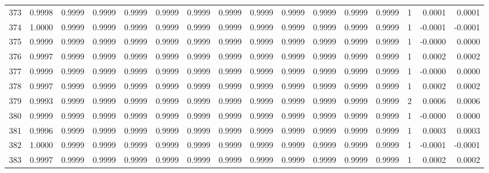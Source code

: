 \begin{tabular}{lrrrrrrrrrrrrrrr}
373 &      0.9998 &  0.9999 &  0.9999 &  0.9999 &  0.9999 &  0.9999 &  0.9999 &  0.9999 &  0.9999 &  0.9999 &   0.9999 &     0.9999 &      1 &                    0.0001 &                     0.0001 \\
374 &      1.0000 &  0.9999 &  0.9999 &  0.9999 &  0.9999 &  0.9999 &  0.9999 &  0.9999 &  0.9999 &  0.9999 &   0.9999 &     0.9999 &      1 &                   -0.0001 &                    -0.0001 \\
375 &      0.9999 &  0.9999 &  0.9999 &  0.9999 &  0.9999 &  0.9999 &  0.9999 &  0.9999 &  0.9999 &  0.9999 &   0.9999 &     0.9999 &      1 &                   -0.0000 &                     0.0000 \\
376 &      0.9997 &  0.9999 &  0.9999 &  0.9999 &  0.9999 &  0.9999 &  0.9999 &  0.9999 &  0.9999 &  0.9999 &   0.9999 &     0.9999 &      1 &                    0.0002 &                     0.0002 \\
377 &      0.9999 &  0.9999 &  0.9999 &  0.9999 &  0.9999 &  0.9999 &  0.9999 &  0.9999 &  0.9999 &  0.9999 &   0.9999 &     0.9999 &      1 &                   -0.0000 &                     0.0000 \\
378 &      0.9997 &  0.9999 &  0.9999 &  0.9999 &  0.9999 &  0.9999 &  0.9999 &  0.9999 &  0.9999 &  0.9999 &   0.9999 &     0.9999 &      1 &                    0.0002 &                     0.0002 \\
379 &      0.9993 &  0.9999 &  0.9999 &  0.9999 &  0.9999 &  0.9999 &  0.9999 &  0.9999 &  0.9999 &  0.9999 &   0.9999 &     0.9999 &      2 &                    0.0006 &                     0.0006 \\
380 &      0.9999 &  0.9999 &  0.9999 &  0.9999 &  0.9999 &  0.9999 &  0.9999 &  0.9999 &  0.9999 &  0.9999 &   0.9999 &     0.9999 &      1 &                   -0.0000 &                     0.0000 \\
381 &      0.9996 &  0.9999 &  0.9999 &  0.9999 &  0.9999 &  0.9999 &  0.9999 &  0.9999 &  0.9999 &  0.9999 &   0.9999 &     0.9999 &      1 &                    0.0003 &                     0.0003 \\
382 &      1.0000 &  0.9999 &  0.9999 &  0.9999 &  0.9999 &  0.9999 &  0.9999 &  0.9999 &  0.9999 &  0.9999 &   0.9999 &     0.9999 &      1 &                   -0.0001 &                    -0.0001 \\
383 &      0.9997 &  0.9999 &  0.9999 &  0.9999 &  0.9999 &  0.9999 &  0.9999 &  0.9999 &  0.9999 &  0.9999 &   0.9999 &     0.9999 &      1 &                    0.0002 &                     0.0002 \\

\end{tabular}
